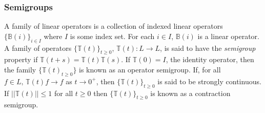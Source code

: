 


\subsubsection{Semigroups}  A family of linear operators is a collection of indexed linear operators \(\{\mathbb B(i)\}_{i\in I}\) where \(I\) is some index set. For each \(i\in I\), \(\mathbb B(i)\) is a linear operator. A family of operators \(\{\mathbb T(t)\}_{t\geq 0}\), \(\mathbb T(t):L\to L\), is said to have the \emph{semigroup} property if \(\mathbb T(t+s)=\mathbb T(t)\mathbb T(s)\). If \(\mathbb T(0)=I\), the identity operator, then the family \(\{\mathbb T(t)_{t\geq 0}\}\) is known as an operator semigroup. If, for all \(f\in L,\, \mathbb T(t)f\to f\) as \(t\to 0^+\), then \(\{\mathbb T(t)\}_{t\geq 0}\) is said to be strongly continuous. If \(||\mathbb T(t)||\leq 1\) for all \(t\geq 0\) then \(\{\mathbb T(t)\}_{t\geq 0}\) is known as a contraction semigroup.

